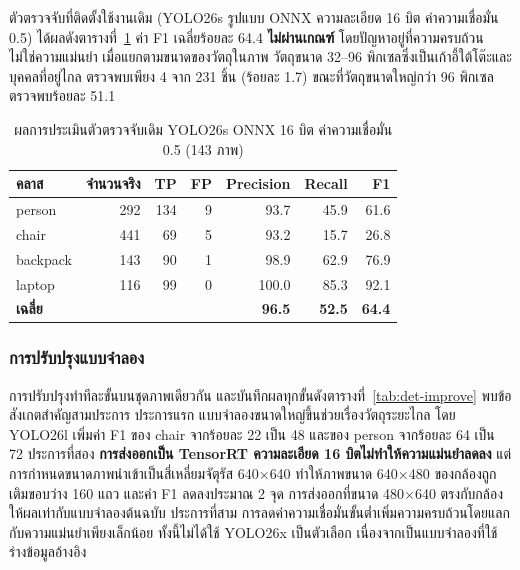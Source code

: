 \documentclass[a4paper,12pt]{report}
\begin{document}
ตัวตรวจจับที่ติดตั้งใช้งานเดิม (YOLO26s รูปแบบ ONNX ความละเอียด 16 บิต ค่าความเชื่อมั่น 0.5)
ได้ผลดังตารางที่~\ref{tab:det-baseline}
ค่า F1 เฉลี่ยร้อยละ 64.4 \textbf{ไม่ผ่านเกณฑ์} โดยปัญหาอยู่ที่ความครบถ้วน ไม่ใช่ความแม่นยำ
เมื่อแยกตามขนาดของวัตถุในภาพ วัตถุขนาด 32--96 พิกเซลซึ่งเป็นเก้าอี้ใต้โต๊ะและบุคคลที่อยู่ไกล
ตรวจพบเพียง 4 จาก 231 ชิ้น (ร้อยละ 1.7) ขณะที่วัตถุขนาดใหญ่กว่า 96 พิกเซลตรวจพบร้อยละ 51.1

\begin{table}[H]
\centering
\caption[ผลการประเมินตัวตรวจจับเดิม YOLO26s (บทที่ 5)]{ผลการประเมินตัวตรวจจับเดิม YOLO26s ONNX 16 บิต ค่าความเชื่อมั่น 0.5 (143 ภาพ)}
\label{tab:det-baseline}
\small
\begin{tabular}{|l|r|r|r|r|r|r|}
\hline
\textbf{คลาส} & \textbf{จำนวนจริง} & \textbf{TP} & \textbf{FP} & \textbf{Precision} & \textbf{Recall} & \textbf{F1} \\
\hline
person & 292 & 134 & 9 & 93.7 & 45.9 & 61.6 \\
chair & 441 & 69 & 5 & 93.2 & 15.7 & 26.8 \\
backpack & 143 & 90 & 1 & 98.9 & 62.9 & 76.9 \\
laptop & 116 & 99 & 0 & 100.0 & 85.3 & 92.1 \\
\hline
\textbf{เฉลี่ย} & & & & \textbf{96.5} & \textbf{52.5} & \textbf{64.4} \\
\hline
\end{tabular}
\end{table}

\subsubsection{การปรับปรุงแบบจำลอง}

การปรับปรุงทำทีละขั้นบนชุดภาพเดียวกัน และบันทึกผลทุกขั้นดังตารางที่~\ref{tab:det-improve}
พบข้อสังเกตสำคัญสามประการ
ประการแรก แบบจำลองขนาดใหญ่ขึ้นช่วยเรื่องวัตถุระยะไกล โดย YOLO26l เพิ่มค่า F1 ของ chair
จากร้อยละ 22 เป็น 48 และของ person จากร้อยละ 64 เป็น 72
ประการที่สอง \textbf{การส่งออกเป็น TensorRT ความละเอียด 16 บิตไม่ทำให้ความแม่นยำลดลง}
แต่การกำหนดขนาดภาพนำเข้าเป็นสี่เหลี่ยมจัตุรัส 640$\times$640
ทำให้ภาพขนาด 640$\times$480 ของกล้องถูกเติมขอบว่าง 160 แถว และค่า F1 ลดลงประมาณ 2 จุด
การส่งออกที่ขนาด 480$\times$640 ตรงกับกล้องให้ผลเท่ากับแบบจำลองต้นฉบับ
ประการที่สาม การลดค่าความเชื่อมั่นขั้นต่ำเพิ่มความครบถ้วนโดยแลกกับความแม่นยำเพียงเล็กน้อย
ทั้งนี้ไม่ได้ใช้ YOLO26x เป็นตัวเลือก เนื่องจากเป็นแบบจำลองที่ใช้ร่างข้อมูลอ้างอิง
\end{document}
